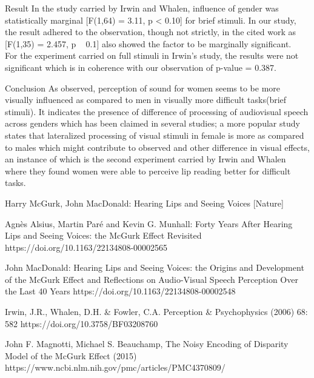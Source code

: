 \documentclass{article}
\begin{document}
\begin{psection}{Result}
	In the study carried by Irwin and Whalen, influence of  gender was statistically marginal [F(1,64) = 3.11, p < 0.10] for brief stimuli. In our study, the result adhered to the observation, though not strictly, in the cited work as [F(1,35) = 2.457, p ~ 0.1] also showed the factor to be marginally significant. 
	\\For the experiment carried on full stimuli in Irwin’s study, the results were not significant which is in coherence with our observation of p-value = 0.387.


\end{psection}

\begin{psection}{Conclusion}
	As observed, perception of sound for women seems to be more visually influenced as compared to men in visually more difficult tasks(brief stimuli). It indicates the presence of difference of processing of audiovisual speech across genders which has been claimed in several studies; a more popular study states that lateralized processing of visual stimuli in female is more as compared to males which might contribute to observed and other difference in visual effects, an instance of which is the second experiment carried by Irwin and Whalen where they found women were able to perceive lip reading better for difficult tasks.
\end{psection}

\begin{thebibliography}{}
	 Harry McGurk, John MacDonald: Hearing Lips and Seeing Voices [Nature]

	Agnès Alsius, Martin Paré and Kevin G. Munhall: Forty Years After Hearing Lips and Seeing Voices: the McGurk Effect Revisited https://doi.org/10.1163/22134808-00002565

	John MacDonald: Hearing Lips and Seeing Voices: the Origins and Development of the McGurk Effect and Reﬂections on Audio-Visual Speech Perception Over the Last 40 Years https://doi.org/10.1163/22134808-00002548

	Irwin, J.R., Whalen, D.H. & Fowler, C.A. Perception & Psychophysics (2006) 68: 582 https://doi.org/10.3758/BF03208760

	John F. Magnotti, Michael S. Beauchamp, The Noisy Encoding of Disparity Model of the McGurk Effect (2015) https://www.ncbi.nlm.nih.gov/pmc/articles/PMC4370809/

\end{thebibliography}
\end{document}
